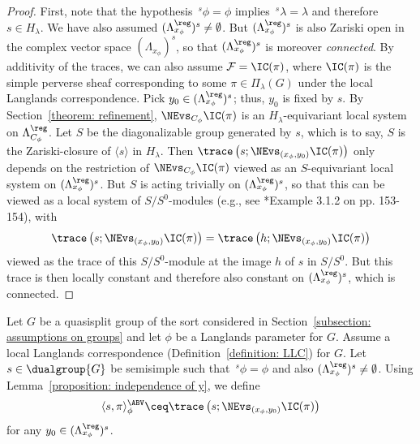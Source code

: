 \documentclass[11pt,letterpaper]{amsart}
\numberwithin{equation}{section}
\begin{document}
\begin{proof}
First, note that the hypothesis $\,^s\phi=\phi$ implies $\,^s\lambda = \lambda$ and therefore $s\in H_\lambda$. 
We have also assumed $(\Lambda_{x_\phi}^\reg)^s \ne \emptyset$. But $(\Lambda_{x_\phi}^\reg)^s$ is also Zariski open in the complex vector space $(\Lambda_{x_\phi})^s$, so that $(\Lambda_{x_\phi}^\reg)^s$ is moreover \emph{connected}.
By additivity of the traces, we can also assume 
$\mathcal{F}=\IC(\pi)$, where $\IC(\pi)$ is the simple perverse sheaf corresponding to some $\pi\in \Pi_{\lambda}(G)$ under the local Langlands correspondence.
Pick $y_0\in (\Lambda_{x_\phi}^\reg)^s$; thus, $y_0$ is fixed by $s$.
By Section~\ref{theorem: refinement}, $\NEvs_{C_\phi}\IC(\pi)$ is an $H_\lambda$-equivariant local system on $\Lambda^\reg_{C_\phi}$.
Let $S$ be the diagonalizable group generated by $s$, which is to say, $S$ is the Zariski-closure of $\langle s \rangle$ in $H_\lambda$. Then $\trace\left({s}; \NEvs_{(x_\phi,y_0)} \IC(\pi) \right)$ only depends on 
the restriction of $\NEvs_{C_\phi}\IC(\pi)$ viewed as an $S$-equivariant local system on $(\Lambda_{x_\phi}^\reg)^s$. But $S$ is acting trivially on $(\Lambda_{x_\phi}^\reg)^s$, so that this can be viewed as a local system of $S/S^0$-modules
(e.g., see \cite{Sch03}*{Example 3.1.2 on pp. 153-154}), with
\[
\trace\left({s}; \NEvs_{(x_\phi,y_0)} \IC(\pi) \right) 
= \trace\left({h}; \NEvs_{(x_\phi,y_0)} \IC(\pi) \right) 
\]
viewed as the trace of this $S/S^0$-module at the image $h$ of $s$ in $S/S^0$. But this trace is then locally constant and therefore also constant on $(\Lambda_{x_\phi}^\reg)^s$, which is connected.
\end{proof}

\begin{definition}\label{definition: trace}
Let $G$ be a quasisplit group of the sort considered in Section~\ref{subsection: assumptions on groups} and let $\phi$ be a Langlands parameter for $G$.
Assume a local Langlands correspondence (Definition~\ref{definition: LLC}) for $G$.
Let $s\in \dualgroup{G}$ be semisimple such that $\,^s\phi = \phi$ and also $(\Lambda^\reg_{x_\phi})^s\neq \emptyset$.
Using Lemma~\ref{proposition: independence of y}, we define
\[
 \langle {s},\pi\rangle_\phi^\ABV
\ceq
\trace\left({s}; \NEvs_{(x_\phi,y_0)} \IC(\pi) \right) 
\]
for any $y_0\in (\Lambda_{x_\phi}^\reg)^s$.
\end{definition}
\end{document}
